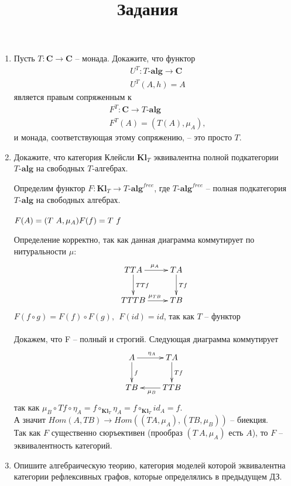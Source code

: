 \documentclass[draft]{article}
\newcommand{\cat}[1]{\mathbf{#1}}
\renewcommand{\C}{\cat{C}}
\begin{document}
\title{Задания}
\maketitle

\begin{enumerate}

\item Пусть $T : \C \to \C$ -- монада.
Докажите, что функтор
\begin{align*}
& U^T : T\text{-}\cat{alg} \to \C \\
& U^T(A,h) = A
\end{align*}
является правым сопряженным к
\begin{align*}
& F^T : \C \to T\text{-}\cat{alg} \\
& F^T(A) = (T(A), \mu_A),
\end{align*}
и монада, соответствующая этому сопряжению, -- это просто $T$.

\item Докажите, что категория Клейсли $\cat{Kl}_T$ эквивалентна полной подкатегории $T\text{-}\cat{alg}$ на свободных $T$-алгебрах.

Определим функтор $F : \cat{Kl}_T \to {T\text{-}\cat{alg}}^{free}$, где ${T\text{-}\cat{alg}}^{free}$ -- полная подкатегория $T\text{-}\cat{alg}$ на свободных алгебрах.\\\\
$F(A) = (T~A, \mu_A)\\
 F(f) = T~f$
 
Определение корректно, так как данная диаграмма коммутирует по нитуральности $\mu$:
\[
\xymatrix{
    TTA \ar[r]^{\mu_A} \ar[d]^{TTf} & TA \ar[d]^{Tf} \\
    TTTB \ar[r]^{\mu_{TB}} & TB
}
\]
$F(f \circ g) = F(f) \circ F(g), ~~F(id) = id$, так как $T$ -- функтор\\\\
Докажем, что F -- полный и строгий. Следующая диаграмма коммутирует
\[
\xymatrix{
    A \ar[r]^{\eta_A} \ar[d]^f & TA \ar[d]^{Tf}\\
    TB & \ar[l]^{\mu_B} TTB
}
\]
так как $\mu_B \circ Tf \circ \eta_A = f \circ_{\cat{Kl}_T} \eta_A = f \circ_{\cat{Kl}_T} id_A = f$. \\
А значит $Hom(A, TB) \to Hom((TA, \mu_A), (TB, \mu_B))$ -- биекция.\\
Так как $F$ существенно сюръективен (прообраз $(T~A, \mu_A)$ есть $A$), то $F$ -- эквивалентность категорий.

\item Опишите алгебраическую теорию, категория моделей которой эквивалентна категории рефлексивных графов, которые определялись в предыдущем ДЗ.


\end{enumerate}
\end{document}
